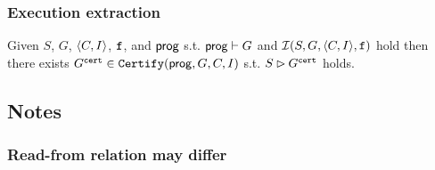 \documentclass[12pt]{article}
\begin{document}

          





  
    

\subsubsection{Execution extraction}

\begin{lemma}
  \label{lemma:sim-extract}
  Given $S$, $G$, $\langle C, I \rangle$, ${\mathtt{f}}$, and $\mathsf{prog}$ 
  s.t. $\mathsf{prog} \vdash G$ and $\mathcal{I}(S, G, \langle C, I \rangle, {\mathtt{f}})$ hold
  then there exists $G^{{\mathtt{cert}}} \in {\mathtt{Certify}}(\mathsf{prog}, G, C, I)$ s.t.
  $S \rhd G^{{\mathtt{cert}}}$ holds.
\end{lemma}

\subsection{Notes}

\subsubsection{Read-from relation may differ}
\end{document}
